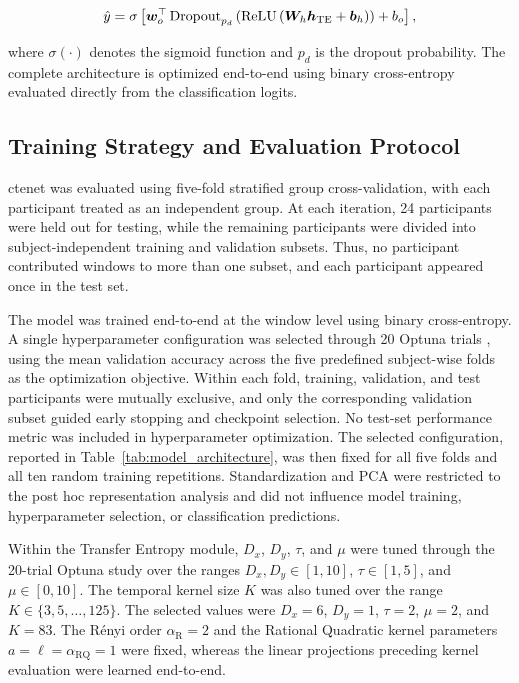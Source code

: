 \begin{equation}
    \hat{y}
    =
    \sigma
    \left[
        {\bm{w}}_{o}^{\top}
        \operatorname{Dropout}_{p_d}
        \left(
            \operatorname{ReLU}
            \left(
                {\bm{W}}_{h}{\bm{h}}_{\mathrm{TE}}
                +
                {\bm{b}}_{h}
            \right)
        \right)
        +
        b_o
    \right],
\end{equation}

where $\sigma(\cdot)$ denotes the sigmoid function and $p_d$ is the dropout probability. The complete architecture is optimized end-to-end using binary cross-entropy evaluated directly from the classification logits.

\subsection{Training Strategy and Evaluation Protocol}
\label{subsec:training_evaluation}

\gls{ctenet} was evaluated using five-fold stratified group cross-validation, with each participant treated as an independent group. At each iteration, 24 participants were held out for testing, while the remaining participants were divided into subject-independent training and validation subsets. Thus, no participant contributed windows to more than one subset, and each participant appeared once in the test set.

{The model was trained end-to-end at the window level using binary cross-entropy. A single hyperparameter configuration was selected through 20 Optuna trials \cite{akiba2019optuna}, using the mean validation accuracy across the five predefined subject-wise folds as the optimization objective. Within each fold, training, validation, and test participants were mutually exclusive, and only the corresponding validation subset guided early stopping and checkpoint selection. No test-set performance metric was included in hyperparameter optimization. The selected configuration, reported in Table~\ref{tab:model_architecture}, was then fixed for all five folds and all ten random training repetitions. Standardization and PCA were restricted to the post hoc representation analysis and did not influence model training, hyperparameter selection, or classification predictions.}

Within the Transfer Entropy module, $D_x$, $D_y$, $\tau$, and $\mu$ were tuned through the 20-trial Optuna study over the ranges $D_x,D_y\in[1,10]$, $\tau\in[1,5]$, and $\mu\in[0,10]$. The temporal kernel size $K$ was also tuned over the range $K\in\{3,5,\ldots,125\}$. The selected values were $D_x=6$, $D_y=1$, $\tau=2$, $\mu=2$, and $K=83$. The Rényi order $\alpha_{\mathrm{R}}=2$ and the Rational Quadratic kernel parameters $a=\ell=\alpha_{\mathrm{RQ}}=1$ were fixed, whereas the linear projections preceding kernel evaluation were learned end-to-end.

